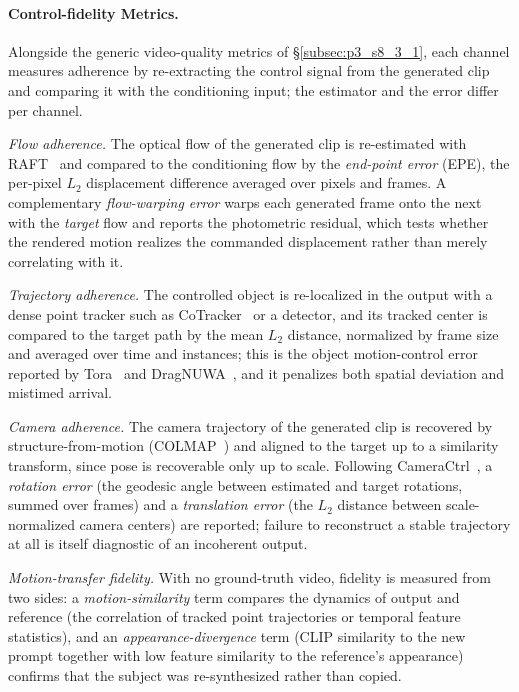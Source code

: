 \paragraph{Control-fidelity Metrics.}
Alongside the generic video-quality metrics of §\ref{subsec:p3_s8_3_1}, each channel measures adherence by re-extracting the control signal from the generated clip and comparing it with the conditioning input; the estimator and the error differ per channel.

\noindent\textit{Flow adherence.} The optical flow of the generated clip is re-estimated with RAFT~\cite{teed2020raft} and compared to the conditioning flow by the \emph{end-point error} (EPE), the per-pixel $L_2$ displacement difference averaged over pixels and frames. A complementary \emph{flow-warping error} warps each generated frame onto the next with the \emph{target} flow and reports the photometric residual, which tests whether the rendered motion realizes the commanded displacement rather than merely correlating with it.

\noindent\textit{Trajectory adherence.} The controlled object is re-localized in the output with a dense point tracker such as CoTracker~\cite{karaev2024cotracker} or a detector, and its tracked center is compared to the target path by the mean $L_2$ distance, normalized by frame size and averaged over time and instances; this is the object motion-control error reported by Tora~\cite{zhang2025tora} and DragNUWA~\cite{yin2023dragnuwa}, and it penalizes both spatial deviation and mistimed arrival.

\noindent\textit{Camera adherence.} The camera trajectory of the generated clip is recovered by structure-from-motion (COLMAP~\cite{schonberger2016structure}) and aligned to the target up to a similarity transform, since pose is recoverable only up to scale. Following CameraCtrl~\cite{he2024cameractrl}, a \emph{rotation error} (the geodesic angle between estimated and target rotations, summed over frames) and a \emph{translation error} (the $L_2$ distance between scale-normalized camera centers) are reported; failure to reconstruct a stable trajectory at all is itself diagnostic of an incoherent output.

\noindent\textit{Motion-transfer fidelity.} With no ground-truth video, fidelity is measured from two sides: a \emph{motion-similarity} term compares the dynamics of output and reference (the correlation of tracked point trajectories or temporal feature statistics), and an \emph{appearance-divergence} term (CLIP similarity to the new prompt together with low feature similarity to the reference's appearance) confirms that the subject was re-synthesized rather than copied.

